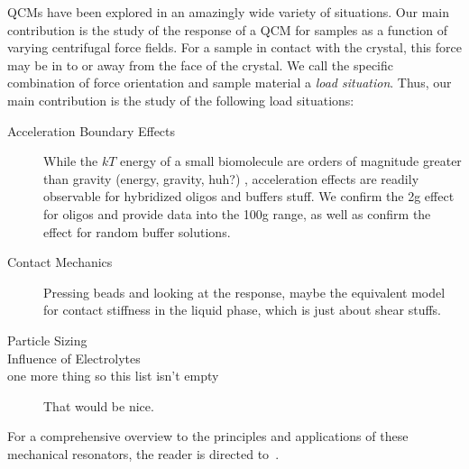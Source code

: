 QCMs have been explored in an amazingly wide variety of situations.  Our
main contribution is the study of the response of a QCM for samples as a
function of varying centrifugal force fields.  For a sample in contact with
the crystal, this force may be in to or away from the face of the
crystal.  We call the specific combination of force orientation and sample
material a \textit{load situation}.  Thus, our main contribution is the
study of the following load situations:

\begin{description}
\item[{Acceleration Boundary Effects}] While the $kT$ energy of a
small biomolecule are orders of magnitude greater than gravity (energy,
gravity, huh?)
, acceleration effects are readily observable for hybridized
oligos and buffers stuff.  We confirm the 2g effect for oligos and provide
data into the 100g range, as well as confirm the effect for random buffer
solutions.
\item[{Contact Mechanics}] Pressing beads and looking at the response,
 maybe the equivalent model for contact stiffness in the liquid phase,
 which is just about shear stuffs.
\item[{Particle Sizing}]
\item[{Influence of Electrolytes}]
\item[{one more thing so this list isn't empty}] That would be nice.
\end{description}

For a comprehensive overview to the principles and applications of these
mechanical resonators, the reader is directed to~\cite{steinemreview}.


